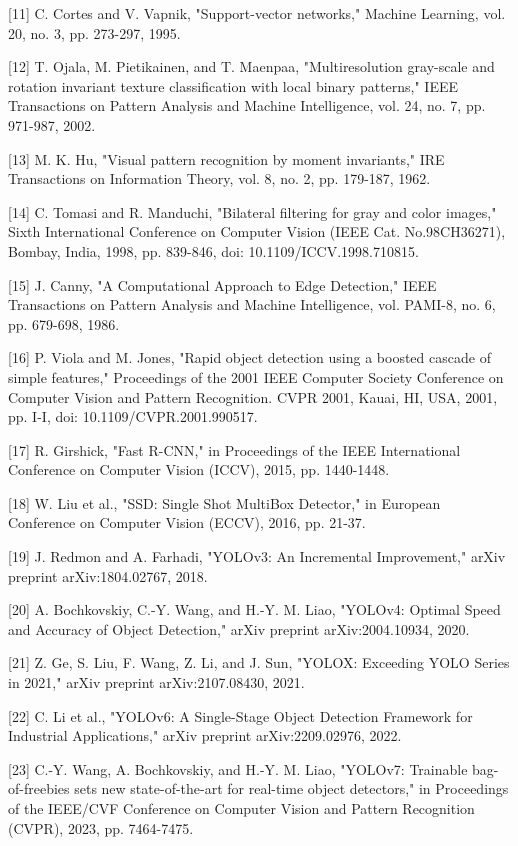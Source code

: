 \documentclass[journal]{IEEEtran}
\begin{document}
[11] C. Cortes and V. Vapnik, "Support-vector networks," Machine Learning, vol. 20, no. 3, pp. 273-297, 1995.

[12] T. Ojala, M. Pietikainen, and T. Maenpaa, "Multiresolution gray-scale and rotation invariant texture classification with local binary patterns," IEEE Transactions on Pattern Analysis and Machine Intelligence, vol. 24, no. 7, pp. 971-987, 2002.

[13] M. K. Hu, "Visual pattern recognition by moment invariants," IRE Transactions on Information Theory, vol. 8, no. 2, pp. 179-187, 1962.

[14] C. Tomasi and R. Manduchi, "Bilateral filtering for gray and color images," Sixth International Conference on Computer Vision (IEEE Cat. No.98CH36271), Bombay, India, 1998, pp. 839-846, doi: 10.1109/ICCV.1998.710815.

[15] J. Canny, "A Computational Approach to Edge Detection," IEEE Transactions on Pattern Analysis and Machine Intelligence, vol. PAMI-8, no. 6, pp. 679-698, 1986.

[16] P. Viola and M. Jones, "Rapid object detection using a boosted cascade of simple features," Proceedings of the 2001 IEEE Computer Society Conference on Computer Vision and Pattern Recognition. CVPR 2001, Kauai, HI, USA, 2001, pp. I-I, doi: 10.1109/CVPR.2001.990517.

[17] R. Girshick, "Fast R-CNN," in Proceedings of the IEEE International Conference on Computer Vision (ICCV), 2015, pp. 1440-1448.

[18] W. Liu et al., "SSD: Single Shot MultiBox Detector," in European Conference on Computer Vision (ECCV), 2016, pp. 21-37.

[19] J. Redmon and A. Farhadi, "YOLOv3: An Incremental Improvement," arXiv preprint arXiv:1804.02767, 2018.

[20] A. Bochkovskiy, C.-Y. Wang, and H.-Y. M. Liao, "YOLOv4: Optimal Speed and Accuracy of Object Detection," arXiv preprint arXiv:2004.10934, 2020.

[21] Z. Ge, S. Liu, F. Wang, Z. Li, and J. Sun, "YOLOX: Exceeding YOLO Series in 2021," arXiv preprint arXiv:2107.08430, 2021.

[22] C. Li et al., "YOLOv6: A Single-Stage Object Detection Framework for Industrial Applications," arXiv preprint arXiv:2209.02976, 2022.

[23] C.-Y. Wang, A. Bochkovskiy, and H.-Y. M. Liao, "YOLOv7: Trainable bag-of-freebies sets new state-of-the-art for real-time object detectors," in Proceedings of the IEEE/CVF Conference on Computer Vision and Pattern Recognition (CVPR), 2023, pp. 7464-7475.
\end{document}
